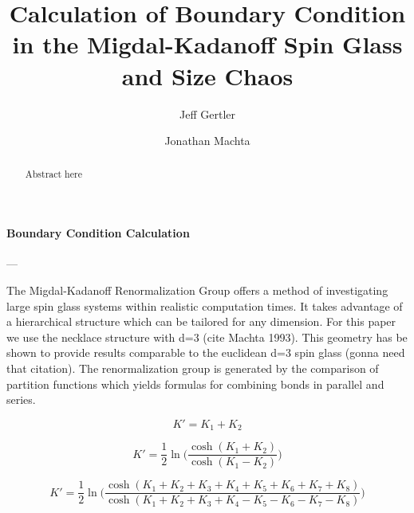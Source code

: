 \documentclass[twocolumn,aps,showpacs,superscriptaddress,prl]{revtex4}
\begin{document}
\title{Calculation of Boundary Condition in the Migdal-Kadanoff Spin Glass and Size Chaos}


\author{Jeff Gertler}


\author{Jonathan Machta}

\begin{abstract}

Abstract here

\end{abstract}

\maketitle



\paragraph*{Boundary Condition Calculation} ---

The Migdal-Kadanoff Renormalization Group offers a method of investigating large spin glass systems within realistic computation times. It takes advantage of a hierarchical structure which can be tailored for any dimension. For this paper we use the necklace structure with d=3 (cite Machta 1993). This geometry has be shown to provide results comparable to the euclidean d=3 spin glass (gonna need that citation). The renormalization group is generated by the comparison of partition functions which yields formulas for combining bonds in parallel and series.



\begin{equation}
K' = K_1 + K_2
\label{eq:par}
\end{equation}

\begin{equation}
K' = \frac{1}{2}\ln \Big(\frac{\cosh(K_1+K_2)}{\cosh(K_1-K_2)} \Big)
\label{eq:ser}
\end{equation}

\begin{equation}
K' = \frac{1}{2}\ln \Big(\frac{\cosh(K_1+K_2+K_3+K_4+K_5+K_6+K_7+K_8)}{\cosh(K_1+K_2+K_3+K_4-K_5-K_6-K_7-K_8)} \Big)
\label{eq:mkrg}
\end{equation}
\end{document}
